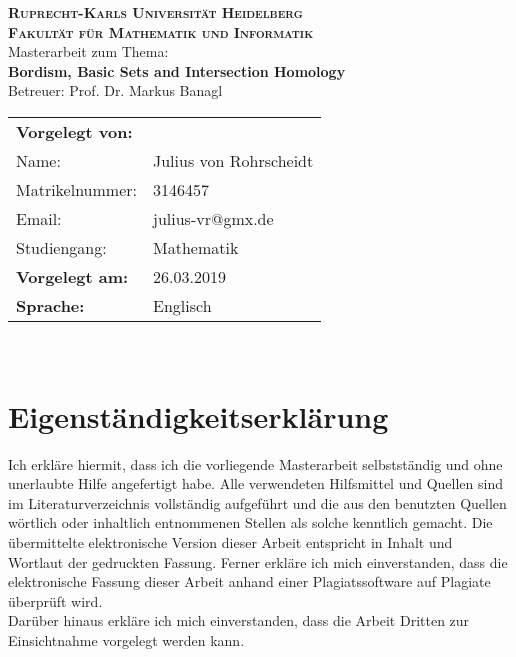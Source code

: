 \documentclass{scrreprt}
\begin{document}
\begin{titlepage}
    \begin{center}
    \LARGE\textbf{\textsc{Ruprecht-Karls Universit\"at Heidelberg}}\\ 
    \vspace{0,1cm}
    \large\textbf{\textsc{Fakult\"at f\"ur Mathematik und Informatik}}\\
    \vspace{6cm}
    \LARGE{{Masterarbeit zum Thema:}}\\
    \vspace{0,3cm}
    \huge \textbf{\textsf{Bordism, Basic Sets and Intersection Homology}} \\
    \vspace{1,5cm}
    \large Betreuer: Prof. Dr. Markus Banagl
    \vspace{4cm}
    \end{center}
 \normalsize{
   {\centering \begin{tabular}{ll}
		\textbf{Vorgelegt von:} \\
		Name: & Julius von Rohrscheidt   \\  	
    	Matrikelnummer: & {3146457} \\
    	Email: &julius-vr@gmx.de \\
    	\vspace{0,2cm}
    	Studiengang: & Mathematik\\
    	\textbf{Vorgelegt am:}  &26.03.2019\\
    	\vspace{0,2cm} 
    	\textbf{Sprache:} &Englisch \\
    \end{tabular}\\
    }}
\end{titlepage}

\section*{Eigenst\"andigkeitserkl\"arung}
\vspace{15mm}
 
Ich erkl\"are hiermit, dass ich die vorliegende Masterarbeit
selbstst\"andig und ohne unerlaubte Hilfe angefertigt habe. Alle
verwendeten Hilfsmittel und Quellen sind im Literaturverzeichnis
vollst\"andig aufgef\"uhrt und die aus den benutzten Quellen w\"ortlich oder
inhaltlich entnommenen Stellen als solche kenntlich gemacht. Die \"ubermittelte
elektronische Version dieser Arbeit entspricht in Inhalt und Wortlaut der gedruckten Fassung. Ferner erkl\"are ich mich einverstanden, dass die elektronische Fassung dieser Arbeit anhand einer Plagiatssoftware auf Plagiate \"uberpr\"uft wird. \\
Dar\"uber hinaus erkl\"are ich mich einverstanden, dass die Arbeit Dritten zur Einsichtnahme vorgelegt werden kann.
\end{document}
